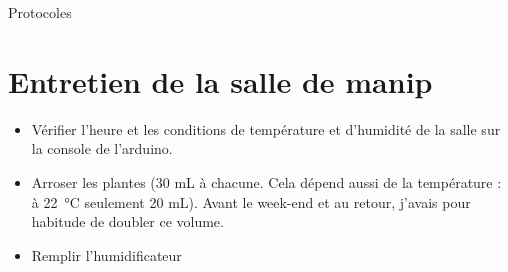 \documentclass[10pt,a4paper]{article}
\begin{document}
\newpage
\begin{center}
    {\Huge Protocoles}
\end{center}
\appendix
\setcounter{secnumdepth}{1}

\section{Entretien de la salle de manip}
\begin{itemize}
\item Vérifier l'heure et les conditions de température et d'humidité de la salle sur la console de l'arduino.
\item Arroser les plantes (30 mL à chacune. Cela dépend aussi de la température : à \SI{22}{\celsius} seulement 20 mL). Avant le week-end et au retour, j'avais pour habitude de doubler ce volume.
\item Remplir l'humidificateur
\end{itemize}
\end{document}
